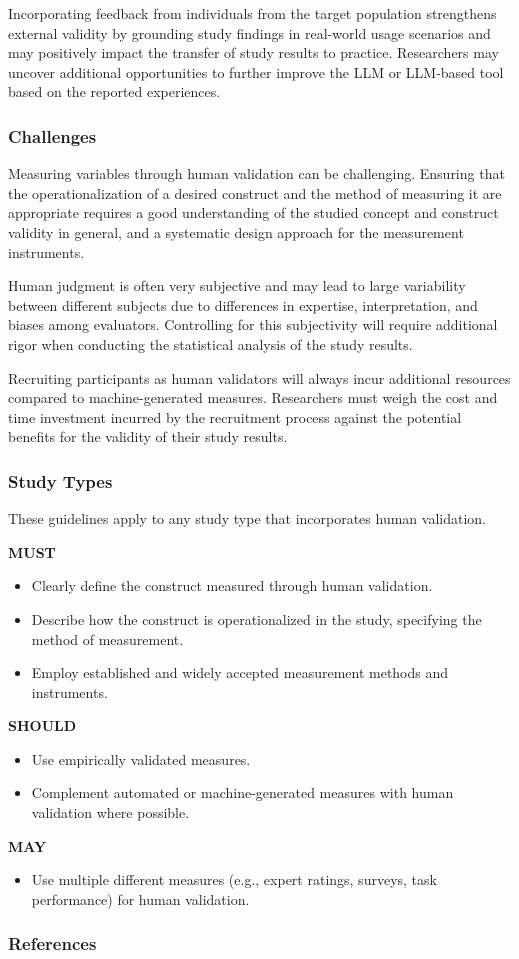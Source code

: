 Incorporating feedback from individuals from the target population strengthens external validity by grounding study findings in real-world usage scenarios and may positively impact the transfer of study results to practice.
Researchers may uncover additional opportunities to further improve the LLM or LLM-based tool based on the reported experiences.

\subsubsection{Challenges}

Measuring variables through human validation can be challenging.
Ensuring that the operationalization of a desired construct and the method of measuring it are appropriate requires a good understanding of the studied concept and construct validity in general, and a systematic design approach for the measurement instruments.

Human judgment is often very subjective and may lead to large variability between different subjects due to differences in expertise, interpretation, and biases among evaluators.
Controlling for this subjectivity will require additional rigor when conducting the statistical analysis of the study results.

Recruiting participants as human validators will always incur additional resources compared to machine-generated measures.
Researchers must weigh the cost and time investment incurred by the recruitment process against the potential benefits for the validity of their study results.

\subsubsection{Study Types}

These guidelines apply to any study type that incorporates human validation.

\textbf{MUST}
\begin{itemize}
    \item Clearly define the construct measured through human validation.
    \item Describe how the construct is operationalized in the study, specifying the method of measurement.
    \item Employ established and widely accepted measurement methods and instruments.
\end{itemize}

\textbf{SHOULD}
\begin{itemize}
    \item Use empirically validated measures.
    \item Complement automated or machine-generated measures with human validation where possible.
\end{itemize}

\textbf{MAY}
\begin{itemize}
    \item Use multiple different measures (e.g., expert ratings, surveys, task performance) for human validation.
\end{itemize}

\subsubsection{References}





